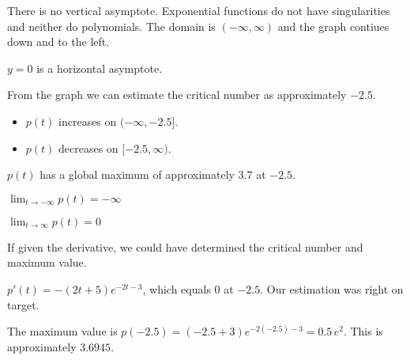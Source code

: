 \documentclass{ximera}
\begin{document}
\begin{example}
\begin{image}
\end{image}




There is no vertical asymptote. Exponential functions do not have singularities and neither do polynomials.  The domain is $(-\infty, \infty)$ and the graph contiues down and to the left.

$y = 0$ is a horizontal asymptote.

From the graph we can estimate the critical number as approximately $-2.5$.





\begin{itemize}
\item $p(t)$ increases on $(-\infty, -2.5]$.
\item $p(t)$ decreases on $[-2.5, \infty)$.
\end{itemize}


$p(t)$ has a global maximum of approximately $3.7$ at $-2.5$.


$\lim_{t \to -\infty} p(t) = -\infty$


$\lim_{t \to \infty} p(t) = 0$






\end{example}

If given the derivative, we could have determined the critical number and maximum value.


$p'(t) = -(2t+5) e^{-2t-3}$, which equals $0$ at $-2.5$.  Our estimation was right on target.  

The maximum value is $p(-2.5) = (-2.5+3)e^{-2(-2.5)-3} = 0.5 \, e^{2}$.  This is approximately $3.6945$.
\end{document}
